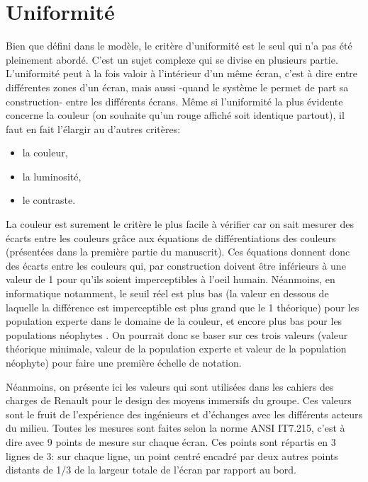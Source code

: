 	\section{Uniformité}
	\par Bien que défini dans le modèle, le critère d'uniformité est le seul qui n'a pas été pleinement abordé. C'est un sujet complexe qui se divise en plusieurs partie. L'uniformité peut à la fois valoir à l'intérieur d'un même écran, c'est à dire entre différentes zones d'un écran, mais aussi -quand le système le permet de part sa construction- entre les différents écrans. Même si l'uniformité la plus évidente concerne la couleur (on souhaite qu'un rouge affiché soit identique partout), il faut en fait l'élargir au d'autres critères:
	\begin{itemize}
		\item la couleur,
		\item la luminosité,
		\item le contraste.
	\end{itemize}
	
	\par La couleur est surement le critère le plus facile à vérifier car on sait mesurer des écarts entre les couleurs grâce aux équations de différentiations des couleurs (présentées dans la première partie du manuscrit). Ces équations donnent donc des écarts entre les couleurs qui, par construction doivent être inférieurs à une valeur de 1 pour qu'ils soient imperceptibles à l'oeil humain. Néanmoins, en informatique notamment, le seuil réel est plus bas (la valeur en dessous de laquelle la différence est imperceptible est plus grand que le 1 théorique) pour les population experte dans le domaine de la couleur, et encore plus bas pour les populations néophytes \citep{vidal_color-difference_2016}. On pourrait donc se baser sur ces trois valeurs (valeur théorique minimale, valeur de la population experte et valeur de la population néophyte) pour faire une première échelle de notation.
	
	\par Néanmoins, on présente ici les valeurs qui sont utilisées dans les cahiers des charges de Renault pour le design des moyens immersifs du groupe. Ces valeurs sont le fruit de l'expérience des ingénieurs et d'échanges avec les différents acteurs du milieu. Toutes les mesures sont faites selon la norme ANSI IT7.215, c'est à dire avec 9 points de mesure sur chaque écran. Ces points sont répartis en 3 lignes de 3: sur chaque ligne, un point centré encadré par deux autres points distants de 1/3 de la largeur totale de l'écran par rapport au bord.
	
